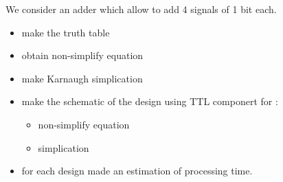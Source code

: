 \documentclass[12pt]{TDTP}
\begin{document}
\titre


\Exo

We consider an adder which allow to add 4 signals of 1 bit each.
\begin{itemize}
	\item make the truth table
	\item obtain non-simplify equation
	\item make Karnaugh simplication
	\item make the schematic of the design using TTL componert for :
		\begin{itemize}
			\item non-simplify equation
			\item simplication
		\end{itemize}
	\item for each design made an estimation of processing time.
\end{itemize}

\end{document}
